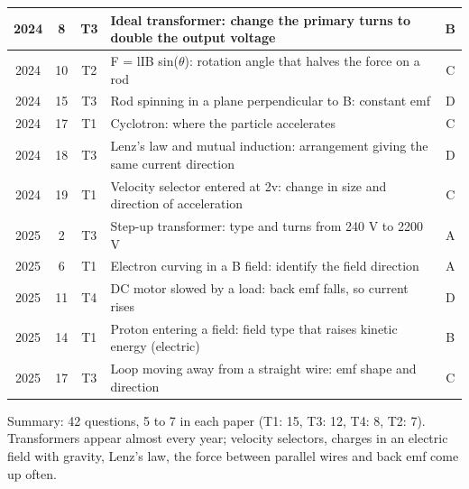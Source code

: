 \documentclass[12pt]{article}
\begin{document}
{\begin{longtable}{|c|c|c|p{108mm}|c|}
    2024 & 8 & T3 & Ideal transformer: change the primary turns to double the output voltage & B\\ \hline
    2024 & 10 & T2 & F = lIB sin($\theta$): rotation angle that halves the force on a rod & C\\ \hline
    2024 & 15 & T3 & Rod spinning in a plane perpendicular to B: constant emf & D\\ \hline
    2024 & 17 & T1 & Cyclotron: where the particle accelerates & C\\ \hline
    2024 & 18 & T3 & Lenz's law and mutual induction: arrangement giving the same current direction & D\\ \hline
    2024 & 19 & T1 & Velocity selector entered at 2v: change in size and direction of acceleration & C\\ \hline
    2025 & 2 & T3 & Step-up transformer: type and turns from 240 V to 2200 V & A\\ \hline
    2025 & 6 & T1 & Electron curving in a B field: identify the field direction & A\\ \hline
    2025 & 11 & T4 & DC motor slowed by a load: back emf falls, so current rises & D\\ \hline
    2025 & 14 & T1 & Proton entering a field: field type that raises kinetic energy (electric) & B\\ \hline
    2025 & 17 & T3 & Loop moving away from a straight wire: emf shape and direction & C\\ \hline
\end{longtable}}

Summary: 42 questions, 5 to 7 in each paper (T1: 15, T3: 12, T4: 8, T2: 7). Transformers appear almost
every year; velocity selectors, charges in an electric field with gravity, Lenz's law, the force between
parallel wires and back emf come up often.
\end{document}
